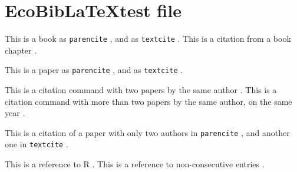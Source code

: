 \documentclass[11pt]{article}
\begin{document}
 
\section*{EcoBib\LaTeX test file}

This is a book as \texttt{parencite} \parencite{Darwin1859}, and as \texttt{textcite}
\textcite{Elton1927}. This is a citation from a book chapter \parencite{Dunne2006}.

This is a paper as \texttt{parencite} \parencite{Holt1996}, and as \texttt{textcite}
\textcite{Anderson2011}.

This is a citation command with two papers by the same author \parencite{Tuomisto2010,Tuomisto2011}.
This is a citation command with more than two papers by the same author, on the same year
\parencite{Frank1993,Frank1993a,Frank1993b}.

This is a citation of a paper with only two authors in \texttt{parencite}
\parencite{PoisotBJLS2010}, and another one in \texttt{textcite} \textcite{Yang2012}.

This is a reference to R \parencite{R-Development-Core-Team2008}. This is a reference to
non-consecutive entries \parencite{Yang2012,Dunne2006,Frank1993,Frank1993a,Frank1993b}.

\printbibliography
\end{document}
